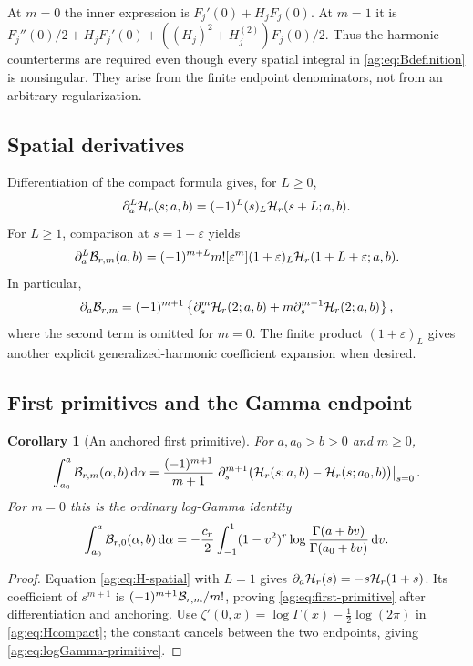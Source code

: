 \documentclass[11pt,letterpaper]{article}
\numberwithin{equation}{section}
\newtheorem{corollary}[theorem]{Corollary}
\theoremstyle{definition}\newtheorem{definition}[theorem]{Definition}
\theoremstyle{remark}\newtheorem{remark}[theorem]{Remark}
\newcommand{\dd}{\,\mathrm d}\newcommand{\ii}{\mathrm i}
\begin{document}
At $m=0$ the inner expression is $F_j'(0)+H_jF_j(0)$.
At $m=1$ it is
$F_j''(0)/2+H_jF_j'(0)+((H_j)^2+H_j^{(2)})F_j(0)/2$.
Thus the harmonic counterterms are required even though every spatial
integral in \eqref{ag:eq:Bdefinition} is nonsingular. They arise from
the finite endpoint denominators, not from an arbitrary regularization.

\subsection{Spatial derivatives}
Differentiation of the compact formula gives, for $L\ge0$,
\begin{equation}\label{ag:eq:H-spatial}
 \partial_a^L\mathcal H_r(s;a,b)=(-1)^L(s)_L\mathcal H_r(s+L;a,b).
\end{equation}
For $L\ge1$, comparison at $s=1+\varepsilon$ yields
\begin{equation}\label{ag:eq:B-spatial}
 \partial_a^L\mathcal B_{r,m}(a,b)
 =(-1)^{m+L}m![\varepsilon^m]
       (1+\varepsilon)_L\mathcal H_r(1+L+\varepsilon;a,b).
\end{equation}
In particular,
\[
 \partial_a\mathcal B_{r,m}=(-1)^{m+1}
  \left\{\partial_s^m\mathcal H_r(2;a,b)
                   +m\partial_s^{m-1}\mathcal H_r(2;a,b)\right\},
\]
where the second term is omitted for $m=0$. The finite product
$(1+\varepsilon)_L$ gives another explicit generalized-harmonic
coefficient expansion when desired.

\subsection{First primitives and the Gamma endpoint}
\begin{corollary}[An anchored first primitive]\label{ag:cor:primitive}
For $a,a_0>b>0$ and $m\ge0$,
\begin{equation}\label{ag:eq:first-primitive}
 \int_{a_0}^a\BB_{r,m}(\alpha,b)\dd\alpha
 =\frac{(-1)^{m+1}}{m+1}
  \left.\partial_s^{m+1}\bigl(\HH_r(s;a,b)-\HH_r(s;a_0,b)\bigr)\right|_{s=0}.
\end{equation}
For $m=0$ this is the ordinary log-Gamma identity
\begin{equation}\label{ag:eq:logGamma-primitive}
 \int_{a_0}^a\BB_{r,0}(\alpha,b)\dd\alpha
 =-\frac{c_r}{2}\int_{-1}^1(1-v^2)^r
       \log\frac{\Gamma(a+bv)}{\Gamma(a_0+bv)}\dd v.
\end{equation}
\end{corollary}
\begin{proof}
Equation \eqref{ag:eq:H-spatial} with $L=1$ gives
$\partial_a\mathcal H_r(s)=-s\mathcal H_r(1+s)$. Its coefficient of $s^{m+1}$ is
$(-1)^{m+1}\mathcal B_{r,m}/m!$, proving
\eqref{ag:eq:first-primitive} after differentiation and anchoring.
Use $\zeta'(0,x)=\log\Gamma(x)-\tfrac12\log(2\pi)$
\cite{DLMFzeta} in \eqref{ag:eq:Hcompact}; the constant cancels between
the two endpoints, giving \eqref{ag:eq:logGamma-primitive}.
\end{proof}
\end{document}
